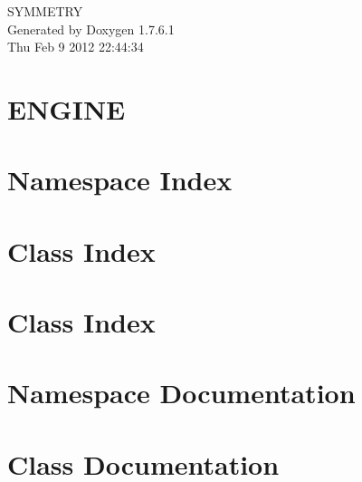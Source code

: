 \documentclass[a4paper]{book}
\begin{document}
\hypersetup{pageanchor=false,citecolor=blue}
\begin{titlepage}
\vspace*{7cm}
\begin{center}
{\Large \-S\-Y\-M\-M\-E\-T\-R\-Y }\\
\vspace*{1cm}
{\large \-Generated by Doxygen 1.7.6.1}\\
\vspace*{0.5cm}
{\small Thu Feb 9 2012 22:44:34}\\
\end{center}
\end{titlepage}
\clearemptydoublepage
{}
\tableofcontents
\clearemptydoublepage
{}
\hypersetup{pageanchor=true,citecolor=blue}
\chapter{\-E\-N\-G\-I\-N\-E}
\label{index}\hypertarget{index}{}
\chapter{\-Namespace \-Index}

\chapter{\-Class \-Index}

\chapter{\-Class \-Index}

\chapter{\-Namespace \-Documentation}

\chapter{\-Class \-Documentation}



















\printindex
\end{document}
